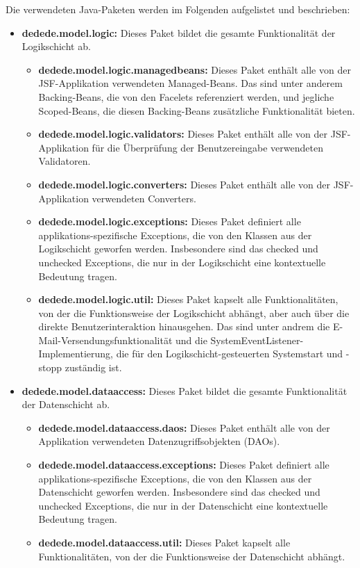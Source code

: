 \documentclass{article}
\begin{document}
Die verwendeten Java-Paketen werden im Folgenden aufgelistet und beschrieben:
\begin{itemize}
	\item \textbf{dedede.model.logic:} Dieses Paket bildet die gesamte Funktionalität der Logikschicht ab.
		\begin{itemize}
			\item \textbf{dedede.model.logic.managedbeans:} Dieses Paket enthält alle von der JSF-Applikation verwendeten Managed-Beans. 
				Das sind unter anderem Backing-Beans, die von den Facelets referenziert werden, und jegliche Scoped-Beans, die diesen Backing-Beans zusätzliche Funktionalität bieten.
			\item \textbf{dedede.model.logic.validators:} Dieses Paket enthält alle von der JSF-Applikation für die Überprüfung der Benutzereingabe verwendeten Validatoren.
			\item \textbf{dedede.model.logic.converters:} Dieses Paket enthält alle von der JSF-Applikation verwendeten Converters.
			\item \textbf{dedede.model.logic.exceptions:} Dieses Paket definiert alle applikations-spezifische Exceptions, die von den Klassen aus der Logikschicht geworfen werden. 
				Insbesondere sind das checked und unchecked Exceptions, die nur in der Logikschicht eine kontextuelle Bedeutung tragen.
			\item \textbf{dedede.model.logic.util:} Dieses Paket kapselt alle Funktionalitäten, von der die Funktionsweise der Logikschicht abhängt, aber auch über die direkte Benutzerinteraktion hinausgehen. 
				Das sind unter andrem die E-Mail-Versendungsfunktionalität und die SystemEventListener-Implementierung, die für den Logikschicht-gesteuerten Systemstart und -stopp zuständig ist.
		\end{itemize}
	\item \textbf{dedede.model.dataaccess:} Dieses Paket bildet die gesamte Funktionalität der Datenschicht ab.
		\begin{itemize}
			\item \textbf{dedede.model.dataaccess.daos:} Dieses Paket enthält alle von der Applikation verwendeten Datenzugriffsobjekten (DAOs).
			\item \textbf{dedede.model.dataaccess.exceptions:} Dieses Paket definiert alle applikations-spezifische Exceptions, die von den Klassen aus der Datenschicht geworfen werden. 
				Insbesondere sind das checked und unchecked Exceptions, die nur in der Datenschicht eine kontextuelle Bedeutung tragen.
			\item \textbf{dedede.model.dataaccess.util:} Dieses Paket kapselt alle Funktionalitäten, von der die Funktionsweise der Datenschicht abhängt. 

\end{itemize}
\end{itemize}
\end{document}
